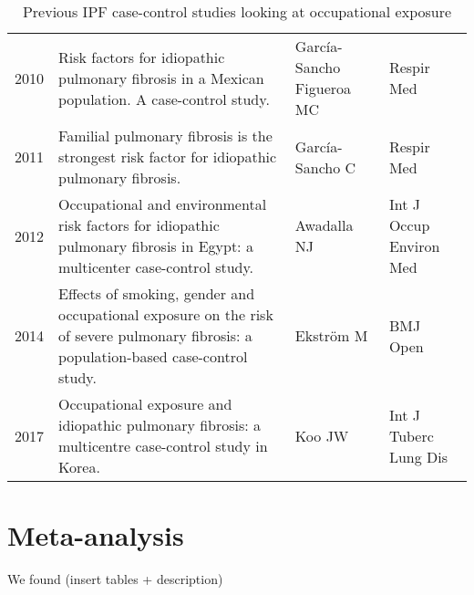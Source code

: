 \documentclass[a4paper,12pt]{article}
\begin{document}
\begin{table}
\begin{tabular}{lp{6cm}ll}
            2010    &                                            Risk factors for idiopathic pulmonary fibrosis in a Mexican population. A case-control study. &  García-Sancho Figueroa MC &                  Respir Med \\
            2011    &                                              Familial pulmonary fibrosis is the strongest risk factor for idiopathic pulmonary fibrosis. &            García-Sancho C &                  Respir Med \\
            2012    &                Occupational and environmental risk factors for idiopathic pulmonary fibrosis in Egypt: a multicenter case-control study. &                Awadalla NJ &     Int J Occup Environ Med \\
            2014    &    Effects of smoking, gender and occupational exposure on the risk of severe pulmonary fibrosis: a population-based case-control study. &                  Ekström M &                    BMJ Open \\
            2017    &                                      Occupational exposure and idiopathic pulmonary fibrosis: a multicentre case-control study in Korea. &                     Koo JW &       Int J Tuberc Lung Dis \\
    \bottomrule
    \end{tabular}
\caption{Previous IPF case-control studies looking at occupational exposure}
\label{table:papers}
\end{table}
                 
\section{Meta-analysis}
We found (insert tables + description)

\clearpage

\makeatletter
 \def\@biblabel#1{#1}
\makeatother



\end{document}
